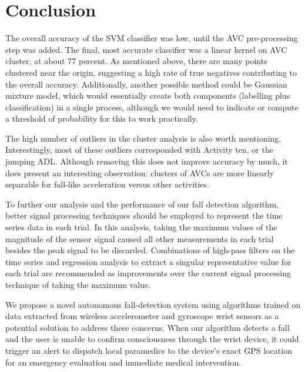\documentclass{llncs}
\begin{document}
    
\section{Conclusion}

The overall accuracy of the SVM classifier was low, until the AVC pre-processing step was added. The final, most accurate classifier was a linear kernel on AVC cluster, at about 77 percent. As mentioned above, there are many points clustered near the origin, suggesting a high rate of true negatives contributing to the overall accuracy. Additionally, another possible method could be Gaussian mixture model, which would essentially create both components (labelling plus classification) in a single process, although we would need to indicate or compute a threshold of probability for this to work practically.

The high number of outliers in the cluster analysis is also worth mentioning. Interestingly, most of these outliers corresponded with Activity ten, or the jumping ADL. Although removing this does not improve accuracy by much, it does present an interesting observation: clusters of AVCs are more linearly separable for fall-like acceleration versus other activities.  

To further our analysis and the performance of our fall detection algorithm, better signal processing techniques should be employed to represent the time series data in each trial. In this analysis, taking the maximum values of the magnitude of the sensor signal caused all other measurements in each trial besides the peak signal to be discarded. Combinations of high-pass filters on the time series and regression analysis to extract a singular representative value for each trial are recommended as improvements over the current signal processing technique of taking the maximum value. 

We propose a novel autonomous fall-detection system using algorithms trained on data extracted from wireless accelerometer and gyroscope wrist sensors as a potential solution to address these concerns. When our algorithm detects a fall and the user is unable to confirm consciousness through the wrist device, it could trigger an alert to dispatch local paramedics to the device's exact GPS location for an emergency evaluation and immediate medical intervention. %




%
%


 {}
 

\end{document}

